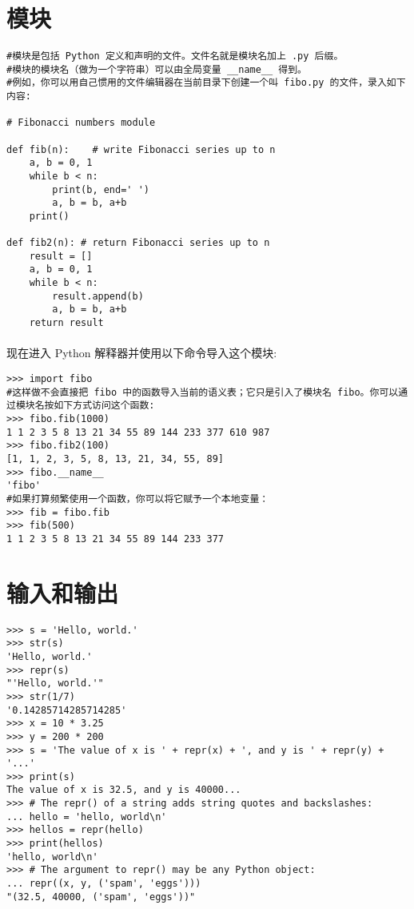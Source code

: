 \documentclass{article}
\begin{document}
\begin{CJK}{UTF8}{gbsn}
\section{模块}
\paragraph{}
\begin{verbatim}
#模块是包括 Python 定义和声明的文件。文件名就是模块名加上 .py 后缀。
#模块的模块名（做为一个字符串）可以由全局变量 __name__ 得到。
#例如，你可以用自己惯用的文件编辑器在当前目录下创建一个叫 fibo.py 的文件，录入如下内容:

# Fibonacci numbers module

def fib(n):    # write Fibonacci series up to n
    a, b = 0, 1
    while b < n:
        print(b, end=' ')
        a, b = b, a+b
    print()

def fib2(n): # return Fibonacci series up to n
    result = []
    a, b = 0, 1
    while b < n:
        result.append(b)
        a, b = b, a+b
    return result
\end{verbatim}
\paragraph{}
现在进入 Python 解释器并使用以下命令导入这个模块:
\begin{verbatim}
>>> import fibo
#这样做不会直接把 fibo 中的函数导入当前的语义表；它只是引入了模块名 fibo。你可以通过模块名按如下方式访问这个函数:
>>> fibo.fib(1000)
1 1 2 3 5 8 13 21 34 55 89 144 233 377 610 987
>>> fibo.fib2(100)
[1, 1, 2, 3, 5, 8, 13, 21, 34, 55, 89]
>>> fibo.__name__
'fibo'
#如果打算频繁使用一个函数，你可以将它赋予一个本地变量：
>>> fib = fibo.fib
>>> fib(500)
1 1 2 3 5 8 13 21 34 55 89 144 233 377
\end{verbatim}
\section{输入和输出}
\begin{verbatim}
>>> s = 'Hello, world.'
>>> str(s)
'Hello, world.'
>>> repr(s)
"'Hello, world.'"
>>> str(1/7)
'0.14285714285714285'
>>> x = 10 * 3.25
>>> y = 200 * 200
>>> s = 'The value of x is ' + repr(x) + ', and y is ' + repr(y) + '...'
>>> print(s)
The value of x is 32.5, and y is 40000...
>>> # The repr() of a string adds string quotes and backslashes:
... hello = 'hello, world\n'
>>> hellos = repr(hello)
>>> print(hellos)
'hello, world\n'
>>> # The argument to repr() may be any Python object:
... repr((x, y, ('spam', 'eggs')))
"(32.5, 40000, ('spam', 'eggs'))"
\end{verbatim}

\end{CJK}
\end{document}
